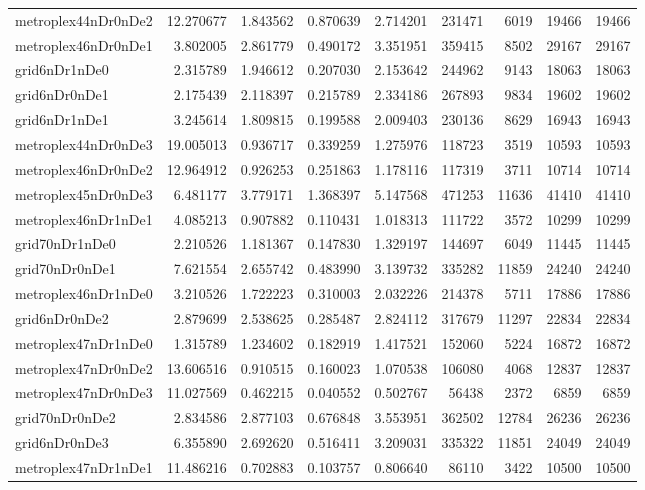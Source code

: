 \begin{longtable}{|l|r|r|r|r|r|r|r|r|}
metroplex44nDr0nDe2 & 12.270677 & 1.843562 & 0.870639 & 2.714201 & 231471 & 6019 & 19466 & 19466 \\
metroplex46nDr0nDe1 & 3.802005 & 2.861779 & 0.490172 & 3.351951 & 359415 & 8502 & 29167 & 29167 \\
grid6nDr1nDe0 & 2.315789 & 1.946612 & 0.207030 & 2.153642 & 244962 & 9143 & 18063 & 18063 \\
grid6nDr0nDe1 & 2.175439 & 2.118397 & 0.215789 & 2.334186 & 267893 & 9834 & 19602 & 19602 \\
grid6nDr1nDe1 & 3.245614 & 1.809815 & 0.199588 & 2.009403 & 230136 & 8629 & 16943 & 16943 \\
metroplex44nDr0nDe3 & 19.005013 & 0.936717 & 0.339259 & 1.275976 & 118723 & 3519 & 10593 & 10593 \\
metroplex46nDr0nDe2 & 12.964912 & 0.926253 & 0.251863 & 1.178116 & 117319 & 3711 & 10714 & 10714 \\
metroplex45nDr0nDe3 & 6.481177 & 3.779171 & 1.368397 & 5.147568 & 471253 & 11636 & 41410 & 41410 \\
metroplex46nDr1nDe1 & 4.085213 & 0.907882 & 0.110431 & 1.018313 & 111722 & 3572 & 10299 & 10299 \\
grid70nDr1nDe0 & 2.210526 & 1.181367 & 0.147830 & 1.329197 & 144697 & 6049 & 11445 & 11445 \\
grid70nDr0nDe1 & 7.621554 & 2.655742 & 0.483990 & 3.139732 & 335282 & 11859 & 24240 & 24240 \\
metroplex46nDr1nDe0 & 3.210526 & 1.722223 & 0.310003 & 2.032226 & 214378 & 5711 & 17886 & 17886 \\
grid6nDr0nDe2 & 2.879699 & 2.538625 & 0.285487 & 2.824112 & 317679 & 11297 & 22834 & 22834 \\
metroplex47nDr1nDe0 & 1.315789 & 1.234602 & 0.182919 & 1.417521 & 152060 & 5224 & 16872 & 16872 \\
metroplex47nDr0nDe2 & 13.606516 & 0.910515 & 0.160023 & 1.070538 & 106080 & 4068 & 12837 & 12837 \\
metroplex47nDr0nDe3 & 11.027569 & 0.462215 & 0.040552 & 0.502767 & 56438 & 2372 & 6859 & 6859 \\
grid70nDr0nDe2 & 2.834586 & 2.877103 & 0.676848 & 3.553951 & 362502 & 12784 & 26236 & 26236 \\
grid6nDr0nDe3 & 6.355890 & 2.692620 & 0.516411 & 3.209031 & 335322 & 11851 & 24049 & 24049 \\
metroplex47nDr1nDe1 & 11.486216 & 0.702883 & 0.103757 & 0.806640 & 86110 & 3422 & 10500 & 10500 \\

\end{longtable}
